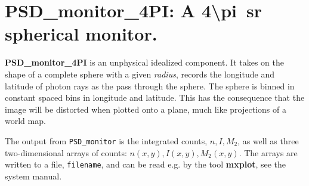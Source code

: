 \section{PSD\_monitor\_4PI: A  \SI{4\pi}{\steradian} spherical monitor.}

\textbf{PSD\_monitor\_4PI} is an unphysical idealized component. It takes on the shape of
a complete sphere with a given \textit{radius}, records the longitude and latitude of 
photon rays as the pass through the sphere.
The sphere is binned in constant spaced bins in longitude and latitude. This has the consequence
that the image will be distorted when plotted onto a plane, much like projections of a world map. 

The output from \texttt{PSD\_monitor} is the integrated counts, $n, I, M_2$,
as well as
three two-dimensional arrays of counts: $n(x,y), I(x,y), M_2(x,y)$.
The arrays are written to a file, \verb+filename+, and can be read e.g. by the tool
\textbf{mxplot}, see the system manual.

